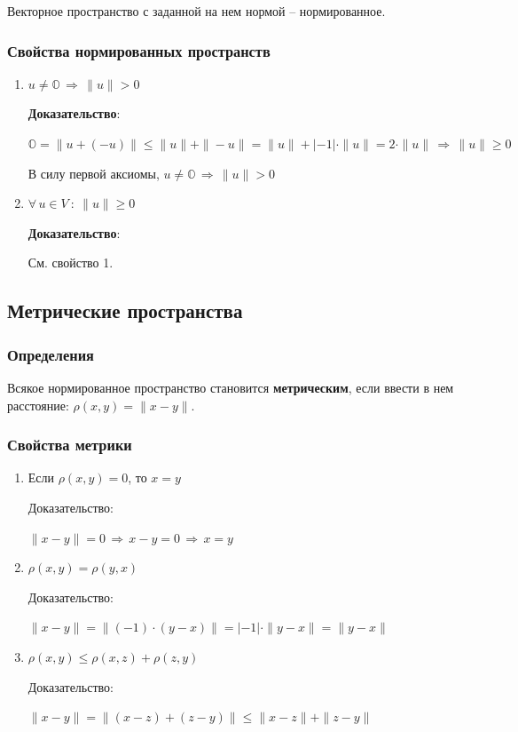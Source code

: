 \documentclass{article}
\begin{document}
Векторное пространство с заданной на нем нормой – нормированное.
\subsubsection{Свойства нормированных пространств}
\begin{enumerate}
    \item $u\neq\mathbb{O}\,\Rightarrow\,\|u\|>0$
    
    \textbf{Доказательство}: 
    
    $\mathbb{O}=\|u+(-u)\|\leqslant\|u\|+\|-u\|=\|u\|+|-1|\cdot\|u\|=2\cdot\|u\|\,\Rightarrow\,\|u\|\geqslant0$
    
    В силу первой аксиомы, $u\neq\mathbb{O}\,\Rightarrow\,\|u\|>0$
    \item $\forall\, u\in V\::\:\|u\|\geqslant0$
    
    \textbf{Доказательство}: 
    
    См. свойство 1.
\end{enumerate}
\subsection{Метрические пространства}
\subsubsection{Определения}
Всякое нормированное пространство становится \textbf{метрическим}, если ввести в нем
расстояние: $\rho(x,y)=\|x-y\|$.

\subsubsection{Свойства метрики}
\begin{enumerate}
    \item Если $\rho(x,y)=0$, то $x = y$
    
    Доказательство: 
    
    $\|x-y\| = 0 \,\Rightarrow\,x-y = 0\,\Rightarrow\, x = y$
    \item $\rho (x,y) = \rho (y,x)$
    
    Доказательство: 
    
    $\|x-y\| = \|(-1)\cdot(y-x)\| = |-1|\cdot\|y-x\| = \|y-x\|$
    \item $\rho (x,y) \leqslant\rho (x,z)+ \rho (z,y)$
    
    Доказательство: 
    
    $\|x-y\| = \|(x-z)+(z-y)\|\leqslant\|x-z\|+\|z-y\|$
\end{enumerate}
\end{document}
